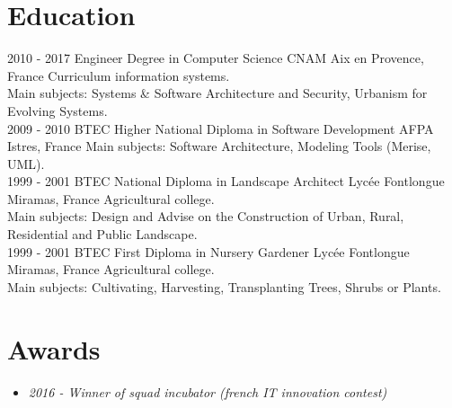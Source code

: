 \documentclass[]{friggeri-cv}
\begin{document}
\section{Education}
\begin{entrylist}
    \entry
        {2010 - 2017}
        {Engineer Degree in Computer Science}
        {CNAM Aix en Provence, France}
        {Curriculum information systems.\\
        Main subjects: Systems \& Software Architecture and Security, Urbanism for Evolving Systems.\\}
    \entry
        {2009 - 2010}
        {BTEC Higher National Diploma in Software Development}
        {AFPA Istres, France}
        {Main subjects: Software Architecture, Modeling Tools (Merise, UML).\\}
    \entry
        {1999 - 2001}
        {BTEC National Diploma in Landscape Architect}
        {Lycée Fontlongue Miramas, France}
        {Agricultural college.\\
        Main subjects: Design and Advise on the Construction of Urban, Rural, Residential and Public Landscape.\\}
    \entry
        {1999 - 2001}
        {BTEC First Diploma in Nursery Gardener}
        {Lycée Fontlongue Miramas, France}
        {Agricultural college.\\
        Main subjects: Cultivating, Harvesting, Transplanting Trees, Shrubs or Plants.}
\end{entrylist}

\section{Awards}
\begin {itemize}
    \item \emph {2016 - Winner of squad incubator (french IT innovation contest)}
\end {itemize}

\newpage
\end{document}
